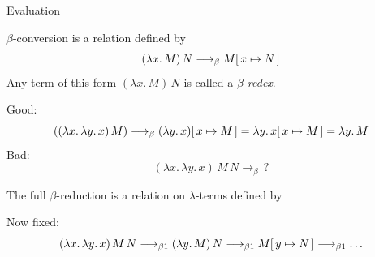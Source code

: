 \begin{frame}[allowframebreaks]{Evaluation}
\begin{definition}
  $\beta$-conversion is a relation defined by
  \[
    (\lambda x.\, M)\, N \longrightarrow_{\beta} M\subst{x}{N}
  \]
  Any term of this form $(\lambda x.\, M)\, N$ is called a \emph{$\beta$-redex}.
\end{definition}
  Good: 
    \[
      ((\lambda x.\,\lambda y.\,x)\,M)
      \longrightarrow_{\beta}
      (\lambda y.\, x)\subst{x}{M}
      = \lambda y.\, x\subst{x}{M}
      = \lambda y.\, M
    \]
  Bad: 
  \[
    (\lambda x.\, \lambda y.\, x)\, M\,N
    \longrightarrow_{\beta} \, ?
  \]
\framebreak
\begin{definition}
  The \alert{full $\beta$-reduction} is a relation on $\lambda$-terms
  defined by
  \begin{multicols}{2}
    \begin{prooftree}
    \end{prooftree}
    \begin{prooftree}
    \end{prooftree}
    \begin{prooftree}
    \end{prooftree}
    \begin{prooftree}
    \end{prooftree}
  \end{multicols}
\end{definition}
  Now fixed:
  \[
    (\lambda x.\, \lambda y.\, x)\, M\,N
    \onereduce (\lambda y.\, M)\,N
    \onereduce M\subst{y}{N} \onereduce \ldots
  \]
\end{frame}

